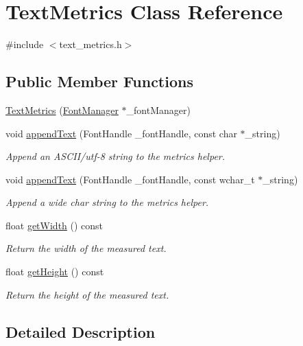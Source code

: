 \hypertarget{class_text_metrics}{\section{Text\+Metrics Class Reference}
\label{class_text_metrics}
}


{\ttfamily \#include $<$text\+\_\+metrics.\+h$>$}

\subsection*{Public Member Functions}
\begin{DoxyCompactItemize}
\item 
\hyperlink{class_text_metrics_a609a0185b714ac21910d2124fe7cb837}{Text\+Metrics} (\hyperlink{class_font_manager}{Font\+Manager} $\ast$\+\_\+font\+Manager)
\item 
void \hyperlink{class_text_metrics_a2c4c0386572fc18cce9885ce3f649f99}{append\+Text} (Font\+Handle \+\_\+font\+Handle, const char $\ast$\+\_\+string)
\begin{DoxyCompactList}\small\item\em Append an A\+S\+C\+I\+I/utf-\/8 string to the metrics helper. \end{DoxyCompactList}\item 
void \hyperlink{class_text_metrics_a66f76a510388e74abd199edeaa593f47}{append\+Text} (Font\+Handle \+\_\+font\+Handle, const wchar\+\_\+t $\ast$\+\_\+string)
\begin{DoxyCompactList}\small\item\em Append a wide char string to the metrics helper. \end{DoxyCompactList}\item 
float \hyperlink{class_text_metrics_a60dd288e8eade71ad6793fd30b8e00dc}{get\+Width} () const 
\begin{DoxyCompactList}\small\item\em Return the width of the measured text. \end{DoxyCompactList}\item 
float \hyperlink{class_text_metrics_a51eb1a1b21f11bdfcfafd3271bf275bd}{get\+Height} () const 
\begin{DoxyCompactList}\small\item\em Return the height of the measured text. \end{DoxyCompactList}\end{DoxyCompactItemize}


\subsection{Detailed Description}



